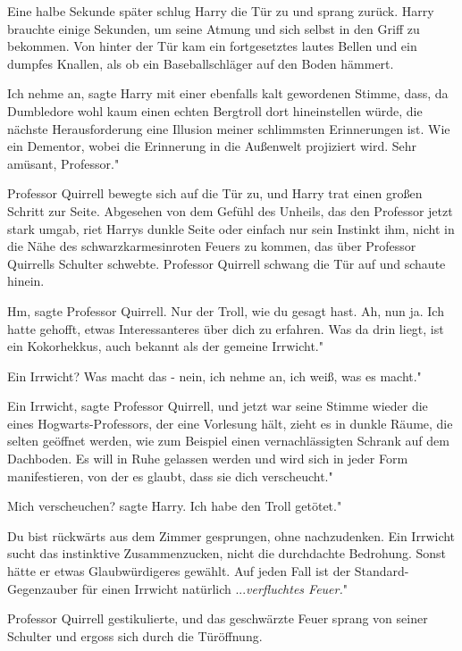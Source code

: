 Eine halbe Sekunde später schlug Harry die Tür zu und sprang zurück. Harry
brauchte einige Sekunden, um seine Atmung und sich selbst in den Griff zu
bekommen. Von hinter der Tür kam ein fortgesetztes lautes Bellen und ein dumpfes
Knallen, als ob ein Baseballschläger auf den Boden hämmert.

\glqq{}Ich nehme an\grqq{}, sagte Harry mit einer ebenfalls kalt gewordenen
Stimme, \glqq{}dass, da Dumbledore wohl kaum einen echten Bergtroll dort
hineinstellen würde, die nächste Herausforderung eine Illusion meiner
schlimmsten Erinnerungen ist. Wie ein Dementor, wobei die Erinnerung in die
Außenwelt projiziert wird. Sehr amüsant, Professor."

Professor Quirrell bewegte sich auf die Tür zu, und Harry trat einen großen
Schritt zur Seite. Abgesehen von dem Gefühl des Unheils, das den Professor jetzt
stark umgab, riet Harrys dunkle Seite oder einfach nur sein Instinkt ihm, nicht
in die Nähe des schwarzkarmesinroten Feuers zu kommen, das über Professor
Quirrells Schulter schwebte. Professor Quirrell schwang die Tür auf und schaute
hinein.

\glqq{}Hm\grqq{}, sagte Professor Quirrell. \glqq{}Nur der Troll, wie du gesagt
hast. Ah, nun ja. Ich hatte gehofft, etwas Interessanteres über dich zu
erfahren. Was da drin liegt, ist ein Kokorhekkus, auch bekannt als der gemeine
Irrwicht."

\glqq{}Ein Irrwicht? Was macht das - nein, ich nehme an, ich weiß, was es macht."

\glqq{}Ein Irrwicht\grqq{}, sagte Professor Quirrell, und jetzt war seine Stimme
wieder die eines Hogwarts-Professors, der eine Vorlesung hält, \glqq{}zieht es in
dunkle Räume, die selten geöffnet werden, wie zum Beispiel einen
vernachlässigten Schrank auf dem Dachboden. Es will in Ruhe gelassen werden und
wird sich in jeder Form manifestieren, von der es glaubt, dass sie dich
verscheucht."

\glqq{}Mich verscheuchen?\grqq{} sagte Harry. \glqq{}Ich habe den Troll getötet."

\glqq{}Du bist rückwärts aus dem Zimmer gesprungen, ohne nachzudenken. Ein
Irrwicht sucht das instinktive Zusammenzucken, nicht die durchdachte Bedrohung.
Sonst hätte er etwas Glaubwürdigeres gewählt. Auf jeden Fall ist der
Standard-Gegenzauber für einen Irrwicht natürlich ...\emph{verfluchtes Feuer.}"

Professor Quirrell gestikulierte, und das geschwärzte Feuer sprang von seiner
Schulter und ergoss sich durch die Türöffnung.

